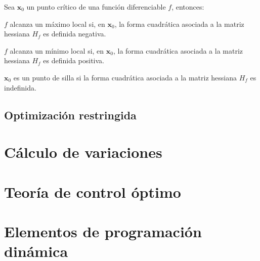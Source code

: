 \documentclass[8pt,a4paper]{extarticle}
\begin{document}
\begin{multicols}{3}
	\begin{boxtheo}
		Sea $\mathbf{x}_0$ un punto crítico de una función diferenciable $f$, entonces:
		\begin{eqlist}
			\item $f$ alcanza un máximo local si, en $\mathbf{x}_0$, la forma cuadrática asociada a la matriz hessiana $H_f$ es definida negativa.
			\item $f$ alcanza un mínimo local si, en $\mathbf{x}_0$, la forma cuadrática asociada a la matriz hessiana $H_f$ es definida positiva.
			\item $\mathbf{x}_0$ es un punto de silla si la forma cuadrática asociada a la matriz hessiana $H_f$ es indefinida.
		\end{eqlist}
	\end{boxtheo}

	\sectionbreak

	\subsection{Optimización restringida}

	\newpage

	\section{Cálculo de variaciones}

	\newpage

	\section{Teoría de control óptimo}

	\newpage

	\section{Elementos de programación dinámica}

	\vfill\eject
	\columnbreak
\end{multicols}
\end{document}
